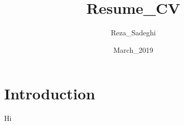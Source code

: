 \documentclass{article}
\title{Resume_CV}
\author{Reza_Sadeghi}
\date{March_2019}
\begin{document}
\maketitle

\section{Introduction}
Hi
\end{document}
